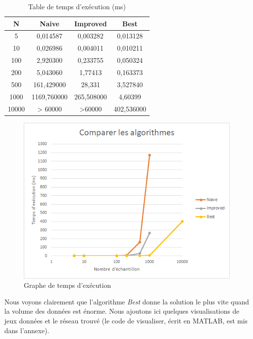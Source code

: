 \documentclass[10pt,a4paper]{article}
\begin{document}
\begin{table}[!ht]
    \begin{center}
        \begin{tabular}{ |c|c|c|c| }
            \hline
            N		&		Naive		    &		Improved		&		Best\\
            \hline
            5		&		0,014587		&		0,003282		&		0,013128\\
            \hline
            10		&		0,026986		&		0,004011		&		0,010211\\
            \hline
            100		&		2,920300		&		0,233755		&		0,050324\\
            \hline
            200		&		5,043060		&		1,77413		    &		0,163373\\
            \hline
            500		&		161,429000		&		28,331		    &		3,527840\\
            \hline
            1000	&		1169,760000		&		265,508000		&		4,60399\\
            \hline
            10000	&		> 60000   		&		>60000	 		&		402,536000\\
            \hline
        \end{tabular}
    \end{center}   
    \caption{Table de temps d'exécution (ms)}     
\end{table}

\begin{figure}[!ht]
    \centering
    \includegraphics[width=0.8\linewidth]{img/P1_time.png}
    \caption{Graphe de temps d'exécution}
\end{figure}

\clearpage

Nous voyons clairement que l'algorithme \emph{Best} donne la solution le plus vite quand la volume des données est énorme. Nous ajoutons ici quelques visualisations de jeux données et le réseau trouvé (le code de visualiser, écrit en MATLAB, est mis dans l'annexe).
\end{document}
